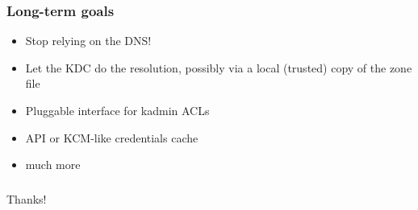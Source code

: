 \documentclass{beamer}
\begin{document}
\begin{frame}
\frametitle{Long-term goals}
\begin{itemize}
\item{Stop relying on the DNS!}
\item{Let the KDC do the resolution, possibly via a local (trusted) copy
	of the zone file}
\item{Pluggable interface for kadmin ACLs}
\item{API or KCM-like credentials cache}
\item{much more}
\end{itemize}
\end{frame}

\begin{frame}
\frametitle{}
\Large{Thanks!}
\end{frame}
\end{document}
